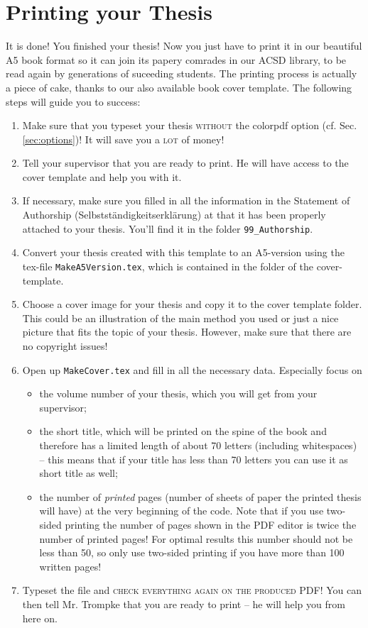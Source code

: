 \section{Printing your Thesis}
\label{sec:print}
It is done! You finished your thesis! Now you just have to print it in our beautiful A5 book format so it can join its papery comrades in our ACSD library, to be read again by generations of suceeding students. 
The printing process is actually a piece of cake, thanks to our also available book cover template. The following steps will guide you to success:
\begin{enumerate}
\item Make sure that you typeset your thesis \textsc{without} the colorpdf option (cf. Sec. \ref{sec:options})! It will save you a \textsc{lot} of money!
\item Tell your supervisor that you are ready to print. He will have access to the cover template and help you with it.
\item If necessary, make sure you filled in all the information in the Statement of Authorship (Selbstst{\"a}ndigkeitserkl{\"a}rung) at that it has been properly attached to your thesis. You'll find it in the folder \texttt{99\_Authorship}.
\item Convert your thesis created with this template to an A5-version using the tex-file \texttt{MakeA5Version.tex}, which is contained in the folder of the cover-template.
\item Choose a cover image for your thesis and copy it to the cover template folder. This could be an illustration of the main method you used or just a nice picture that fits the topic of your thesis. However, make sure that there are no copyright issues!
\item Open up \texttt{MakeCover.tex} and fill in all the necessary data. Especially focus on
\begin{itemize}
\item the volume number of your thesis, which you will get from your supervisor;
\item the short title, which will be printed on the spine of the book and therefore has a limited length of about 70 letters (including whitespaces) -- this means that if your title has less than 70 letters you can use it as short title as well;
\item the number of \textit{printed} pages (\ie number of sheets of paper the printed thesis will have) at the very beginning of the code. Note that if you use two-sided printing the number of pages shown in the PDF editor is twice the number of printed pages! For optimal results this number should not be less than 50, so only use two-sided printing if you have more than 100 written pages!
\end{itemize}
\item Typeset the file and \textsc{check everything again on the produced PDF!} You can then tell Mr. Trompke that you are ready to print -- he will help you from here on.
\end{enumerate}



